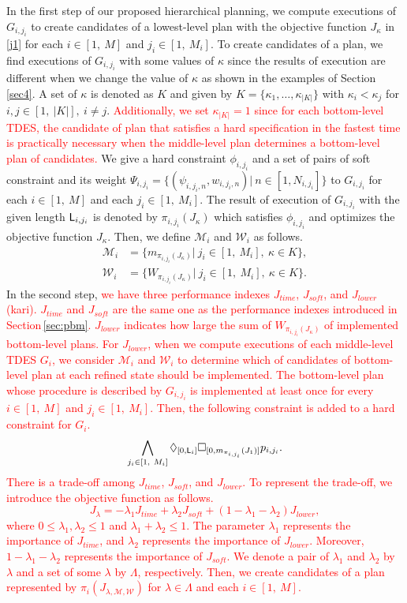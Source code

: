 \documentclass[journal,twoside,web]{IEEEtran}
\newcommand{\req}[1]{\eqref{#1}}
\newcommand{\rsec}[1]{Section\,\ref{#1}}
\newcommand{\Len}{{\sf L}}
\newcommand{\M}{\mathcal{M}}
\newcommand{\W}{\mathcal{W}}
\newcommand{\F}[1]{\Diamond_{[#1]}}
\newcommand{\G}[1]{\Box_{[#1]}}
\newcommand{\red}[1]{\textcolor{red}{#1}}
\begin{document}
In the first step of our proposed hierarchical planning, we compute executions of $G_{i,{j_i}}$ to create candidates of a lowest-level plan with the objective function $J_\kappa$ in \req{j1} for each $i\in[1,~M]$ and $j_i\in[1,~M_i]$.
%
%
To create candidates of a plan, we find executions of $G_{i,{j_i}}$ with some values of $\kappa$ since the results of execution are different when we change the value of $\kappa$ as shown in the examples of \rsec{sec4}.
%
A set of $\kappa$ is denoted as $K$ and given by
$K=\{\kappa_1,\ldots,\kappa_{|K|}\}$ with $\kappa_i< \kappa_j$ for $i,j\in [1,~|K|],~i\neq j$.
\red{Additionally, we set $\kappa_{|K|}=1$ since for each bottom-level TDES, the candidate of plan that satisfies a hard specification in the fastest time is practically necessary when the middle-level plan determines a bottom-level plan of candidates.}
%
We give a hard constraint $\phi_{i,{j_i}}$ and a set of pairs of soft constraint and its weight $\Psi_{i,{j_i}}=\{(\psi_{i,j_i,n},w_{i,j_i,n})|~n\in [1,N_{i,j_i}]\}$ to $G_{i,{j_i}}$ for each $i\in[1,~M]$ and each $j_i\in[1,~M_i]$.
The result of execution of $G_{i,{j_i}}$ with the given length $\Len_{i,{j_i}}$ is denoted by $\pi_{i,{j_i}}(J_\kappa)$ which satisfies $\phi_{i,{j_i}}$ and optimizes the objective function $J_\kappa$.
%
%
Then, we define $\mathcal{M}_i$ and $\mathcal{W}_i$ as follows.
\begin{align}
\mathcal{M}_i&=\{m_{\pi_{i,{j_i}}(J_\kappa)}|~j_i\in[1,~M_i],~\kappa\in K\},\\
\mathcal{W}_i&=\{W_{\pi_{i,{j_i}}(J_\kappa)}|~j_i\in[1,~M_i],~\kappa\in K\}.
\end{align}
%
In the second step, \red{we have three performance indexes $J_{time}$, $J_{soft}$, and $J_{lower}$(kari).
$J_{time}$ and $J_{soft}$ are the same one as the performance indexes introduced in \rsec{sec:pbm}.
$J_{lower}$ indicates how large the sum of $W_{\pi_{i,{j_i}}(J_\kappa)}$ of implemented bottom-level plans.
For $J_{lower}$, when we compute executions of each middle-level TDES $G_i$, we consider $\M_i$ and $\W_i$ to determine which of candidates of bottom-level plan at each refined state should be implemented.}
\red{The bottom-level plan whose procedure is described by $G_{i,j_i}$ is implemented at least once for every $i\in[1,~M]$ and $j_i\in[1,~M_i]$. Then, the following constraint is added to a hard constraint for $G_i$.
\[
\bigwedge_{j_i\in[1,~M_i]}\F{0,\Len_i}\G{0,m_{\pi_{i,j_i}}(J_{1})}p_{i,j_i}.
\]
There is a trade-off among $J_{time}$, $J_{soft}$, and $J_{lower}$.
To represent the trade-off, we introduce the objective function as follows.
\[
J_\lambda=-\lambda_1 J_{time} + \lambda_2J_{soft}+ (1-\lambda_1-\lambda_2)J_{lower},
\]
where $0\leq\lambda_1,{\lambda}_2\leq1$ and $\lambda_1+{\lambda}_2\leq1$.
The parameter $\lambda_1$ represents the importance of $J_{time}$, and $\lambda_2$ represents the importance of $J_{lower}$.
Moreover, $1-\lambda_1-\lambda_2$ represents the importance of $J_{soft}$.
We denote a pair of $\lambda_1$ and $\lambda_2$ by $\lambda$ and a set of some $\lambda$ by $\Lambda$, respectively.
Then, we create candidates of a plan represented by $\pi_{i}(J_{\lambda,\M,\W})$ for $\lambda\in\Lambda$ and each $i\in[1,~M]$.}
\end{document}
